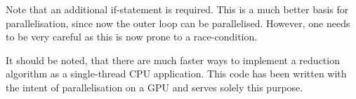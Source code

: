 

Note that an additional if-statement is required.
This is a much better basis for parallelisation, since now the outer loop can be parallelised.
However, one needs to be very careful as this is now prone to a race-condition.

It should be noted, that there are much faster ways to implement a reduction algorithm as a single-thread CPU application.
This code has been written with the intent of parallelisation on a GPU and serves solely this purpose.

